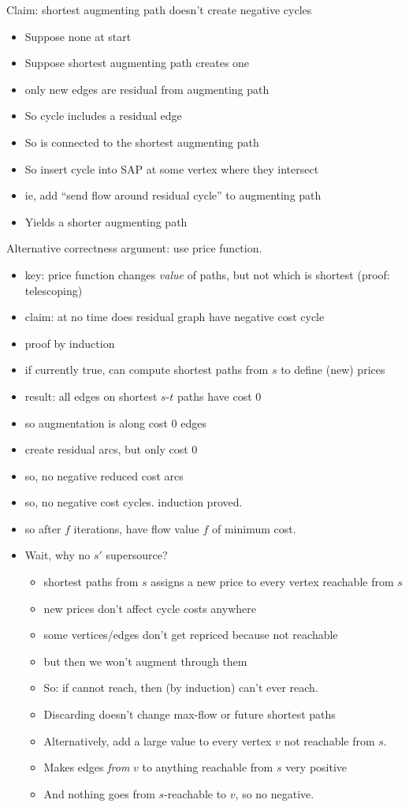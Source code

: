 \documentclass{article}
\begin{document}
Claim: shortest augmenting path doesn't create negative cycles
\begin{itemize}
\item Suppose none at start
\item Suppose shortest augmenting path creates one
\item only new edges are residual from augmenting path
\item So cycle includes a residual edge
\item So is connected to the shortest augmenting path
\item So insert cycle into SAP at some vertex where they intersect
\item ie, add ``send flow around residual cycle'' to augmenting path
\item Yields a shorter augmenting path
\end{itemize}


Alternative correctness argument: use price function.
\begin{itemize}
\item key: price function changes {\em value} of paths, but not which
  is shortest (proof: telescoping)
\item claim: at no time does residual graph have negative cost cycle
\item proof by induction
\item if currently true, can compute shortest paths from $s$ to define
  (new) prices
\item result: all edges on shortest $s$-$t$ paths have cost 0
\item so augmentation is along cost 0 edges
\item create residual arcs, but only cost 0
\item so, no negative reduced cost arcs
\item so, no negative cost cycles.  induction proved.
\item so after $f$ iterations, have flow value $f$ of minimum cost.
\item Wait, why no $s'$ supersource?
\begin{itemize}
\item shortest paths from $s$ assigns a new price to every vertex
  reachable from $s$
\item new prices don't affect cycle costs anywhere
\item some vertices/edges don't get repriced because not reachable
\item but then we won't augment through them
\item So: if cannot reach, then (by induction) can't ever reach.
\item Discarding doesn't change max-flow or future shortest paths
\item Alternatively, add a large value to every vertex $v$ not reachable from $s$.
\item Makes edges \emph{from} $v$ to anything reachable from $s$ very positive
  \item And nothing goes from $s$-reachable to $v$, so no negative.
\end{itemize}
\end{itemize}
\end{document}
